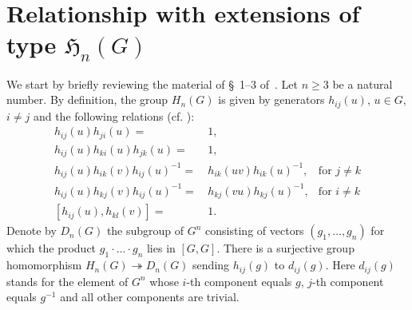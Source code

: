 \documentclass[oneside, 12pt]{amsart}
\theoremstyle{plain}
\numberwithin{equation}{section}
\numberwithin{lemma}{section}
\theoremstyle{remark}
\theoremstyle{definition}
\begin{document}
\section{Relationship with extensions of type \texorpdfstring{$\mathfrak{H}_n(G)$}{Hn(G)}}
We start by briefly reviewing the material of \S~1--3 of~\cite{Reh78}. 
Let $n \geq 3$ be a natural number. By definition, the group $H_n(G)$ is given by generators
$h_{ij}(u)$, $u\in G$, $i\neq j$ and the following relations (cf. \cite[H1--H5~of~\S~2]{Reh78}):
\begin{align}
h_{ij}(u) h_{ji}(u)                = &\, 1,                        &                     \tag{H1} \label{RH1} \\
h_{ij}(u) h_{ki}(u) h_{jk}(u)      = &\, 1,                        &                     \tag{H2} \label{RH2} \\
h_{ij}(u) h_{ik}(v) h_{ij}(u)^{-1} = &\, h_{ik}(uv) h_{ik}(u)^{-1},& \text{for } j\neq k \tag{H3} \label{RH3} \\
h_{ij}(u) h_{kj}(v) h_{ij}(u)^{-1} = &\, h_{kj}(vu) h_{kj}(u)^{-1},& \text{for } i\neq k \tag{H4} \label{RH4} \\
[h_{ij}(u), h_{kl}(v)]             = &\, 1.                        &                     \tag{H5} \label{RH5} \end{align}
Denote by $D_n(G)$ the subgroup of $G^n$ consisting of vectors
 $(g_1,\ldots, g_n)$ for which the product $g_1\cdot \ldots \cdot g_n$ lies in $[G, G]$.
There is a surjective group homomorphism $H_n(G) \twoheadrightarrow D_n(G)$ sending $h_{ij}(g)$ to $d_{ij}(g)$.
Here $d_{ij}(g)$ stands for the element of $G^n$ whose
 $i$-th component equals $g$, $j$-th component equals $g^{-1}$ and all other components are trivial.
\end{document}
